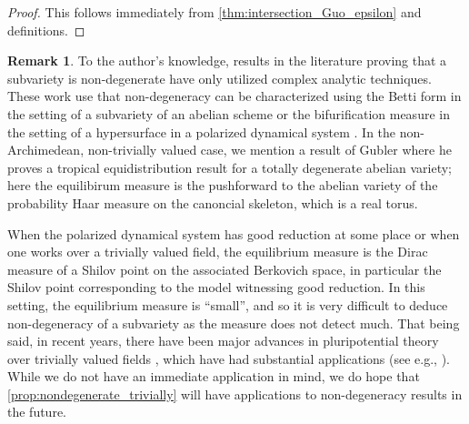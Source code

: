 \documentclass[11pt,reqno]{amsart}
\newcommand{\mZ}{\mathbb{Z}}
\newcommand{\sH}{{\mathscr H}}
\newcommand{\sM}{{\mathscr M}}
\theoremstyle{theorem}
\numberwithin{equation}{subsection}
\numberwithin{equation}{subsection}
\theoremstyle{definition}
\newtheorem{remark}[subsubsection]{Remark}
\theoremstyle{remark}
\numberwithin{equation}{subsubsection} \numberwithin{figure}{section}
\begin{document}
\begin{proof}
This follows immediately from \autoref{thm:intersection_Guo_epsilon} and definitions. 
\end{proof}

\begin{remark}
To the author's knowledge, results in the literature proving that a subvariety is non-degenerate have only utilized complex analytic techniques. 
These work use that non-degeneracy can be characterized using the Betti form in the setting of a subvariety of an abelian scheme \cite{DGH:Uniform} or the bifurification measure in the setting of a hypersurface in a polarized dynamical system \cite{DemarcoMavraki:DynamicsP1}. 
In the non-Archimedean, non-trivially valued case, we mention a result of Gubler \cite{Guber:BogomolovConjecture} where he proves a tropical equidistribution result for a totally degenerate abelian variety; here the equilibirum measure is the pushforward to the abelian variety of the probability Haar measure on the canoncial skeleton, which is a real torus.  

When the polarized dynamical system has good reduction at some place or when one works over a trivially valued field, the equilibrium measure is the Dirac measure of a Shilov point on the associated Berkovich space, in particular the Shilov point corresponding to the model witnessing good reduction.  
In this setting, the equilibrium measure is ``small'', and so it is very difficult to deduce non-degeneracy of a subvariety as the measure does not detect much. 
That being said, in recent years, there have been major advances in pluripotential theory over trivially valued fields \cite{BoucksomJonsson:GlobalPluriTriv}, which have had substantial applications (see e.g., \cite{BoucksomJonsson:NAKStability1, BoucksomJonsson:NAKStability2}). 
While we do not have an immediate application in mind, we do hope that \autoref{prop:nondegenerate_trivially} will have applications to non-degeneracy results in the future.
\end{remark}
\end{document}
